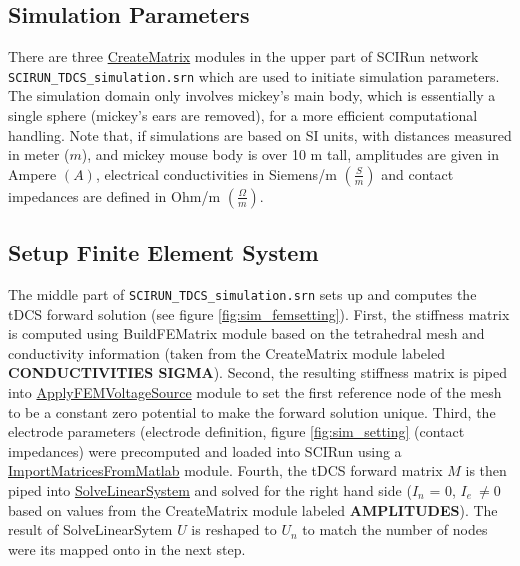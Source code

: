 \documentclass[fleqn,11pt,openany]{book}
\begin{document}
\subsection{Simulation Parameters}

There are three \href{http://scirundocwiki.sci.utah.edu/SCIRunDocs/index.php5/CIBC:Documentation:SCIRun:Reference:SCIRun:CreateMatrix}{CreateMatrix} modules in the upper part of SCIRun network \\
\texttt{SCIRUN\_TDCS\_simulation.srn} which are used to initiate simulation parameters.
The simulation domain only involves mickey's main body, which is essentially a single sphere (mickey's ears are removed), for a more efficient computational handling.
Note that, if simulations are based on SI units, with distances measured in meter ($m$), and mickey mouse body is over 10 m tall, amplitudes are given in Ampere $(A)$, electrical conductivities in Siemens/m $\left(\frac{S}{m}\right)$ and contact impedances are defined in Ohm/m $\left(\frac{\Omega}{m}\right)$.

\subsection{Setup Finite Element System}

The middle part of \texttt{SCIRUN\_TDCS\_simulation.srn} sets up and computes the tDCS forward solution (see figure \ref{fig:sim_femsetting}).
First, the stiffness matrix is computed using BuildFEMatrix module based on the tetrahedral mesh and conductivity information (taken from the CreateMatrix module labeled \textbf{CONDUCTIVITIES SIGMA}).
Second, the resulting stiffness matrix is piped into \href{http://scirundocwiki.sci.utah.edu/SCIRunDocs/index.php5/CIBC:Documentation:SCIRun:Reference:BioPSE:ApplyFEMVoltageSource}{ApplyFEMVoltageSource} module to set the first reference node of the mesh to be a constant zero potential to make the forward solution unique.
Third, the electrode parameters (electrode definition, figure \ref{fig:sim_setting} (contact impedances) were precomputed and loaded into SCIRun using a \href{http://scirundocwiki.sci.utah.edu/SCIRunDocs/index.php5/CIBC:Documentation:SCIRun:Reference:MatlabInterface:ImportMatricesFromMatlab}{ImportMatricesFromMatlab} module.
Fourth, the tDCS forward matrix $M$ is then piped into \href{http://scirundocwiki.sci.utah.edu/SCIRunDocs/index.php5/CIBC:Documentation:SCIRun:Reference:SCIRun:SolveLinearSystem}{SolveLinearSystem} and solved for the right hand side ($I_n$ = 0, $I_{e}\ \ne 0$ based on values from the CreateMatrix module labeled \textbf{AMPLITUDES}).
The result of SolveLinearSytem $U$ is reshaped to $U_{n}$ to match the number of nodes were its mapped onto in the next step.
\end{document}
